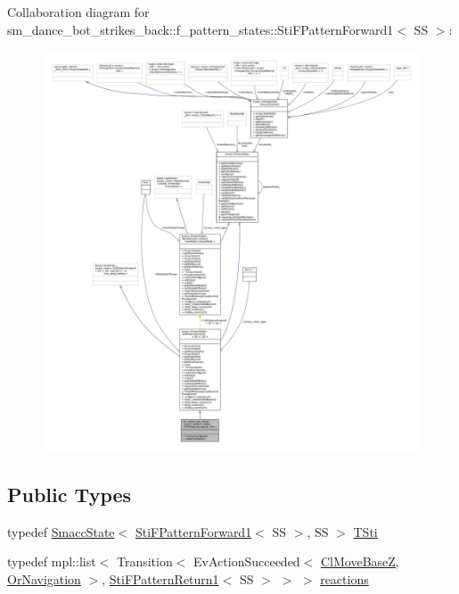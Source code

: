 Collaboration diagram for sm\+\_\+dance\+\_\+bot\+\_\+strikes\+\_\+back\+:\+:f\+\_\+pattern\+\_\+states\+:\+:Sti\+F\+Pattern\+Forward1$<$ SS $>$\+:
\nopagebreak
\begin{figure}[H]
\begin{center}
\leavevmode
\includegraphics[width=350pt]{structsm__dance__bot__strikes__back_1_1f__pattern__states_1_1StiFPatternForward1__coll__graph}
\end{center}
\end{figure}
\subsection*{Public Types}
\begin{DoxyCompactItemize}
\item 
typedef \hyperlink{classSmaccState}{Smacc\+State}$<$ \hyperlink{structsm__dance__bot__strikes__back_1_1f__pattern__states_1_1StiFPatternForward1}{Sti\+F\+Pattern\+Forward1}$<$ SS $>$, SS $>$ \hyperlink{structsm__dance__bot__strikes__back_1_1f__pattern__states_1_1StiFPatternForward1_a30d04bd6c724d937fdbb5ca3f1ee3bbd}{T\+Sti}
\item 
typedef mpl\+::list$<$ Transition$<$ Ev\+Action\+Succeeded$<$ \hyperlink{classmove__base__z__client_1_1ClMoveBaseZ}{Cl\+Move\+BaseZ}, \hyperlink{classsm__dance__bot__strikes__back_1_1OrNavigation}{Or\+Navigation} $>$, \hyperlink{structsm__dance__bot__strikes__back_1_1f__pattern__states_1_1StiFPatternReturn1}{Sti\+F\+Pattern\+Return1}$<$ SS $>$ $>$ $>$ \hyperlink{structsm__dance__bot__strikes__back_1_1f__pattern__states_1_1StiFPatternForward1_aecdba10117b77cc20781cd23bd77fe7e}{reactions}
\end{DoxyCompactItemize}

